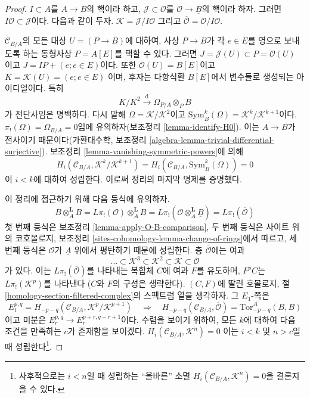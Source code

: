 \begin{proof}
$I \subset A$를 $A \to B$의 핵이라 하고, $\mathcal{J} \subset \mathcal{O}$를
$\mathcal{O} \to \underline{B}$의 핵이라 하자. 그러면
$I\mathcal{O} \subset \mathcal{J}$이다. 다음과 같이 두자.
$\mathcal{K} = \mathcal{J}/I\mathcal{O}$ 그리고
$\overline{\mathcal{O}} = \mathcal{O}/I\mathcal{O}$.

\medskip\noindent
$\mathcal{C}_{B/A}$의 모든 대상 $U = (P \to B)$에 대하여, 사상
$P \to B$가 각 $e \in E$를 영으로 보내도록 하는 동형사상
$P = A[E]$를 택할 수 있다. 그러면
$J = \mathcal{J}(U) \subset P = \mathcal{O}(U)$
이고 $J = IP + (e; e \in E)$이다. 또한
$\overline{\mathcal{O}}(U) = B[E]$이고 $K = \mathcal{K}(U) = (e; e \in E)$
이며, 후자는 다항식환 $B[E]$에서 변수들로 생성되는 아이디얼이다. 특히
$$
K/K^2 \xrightarrow{\text{d}} \Omega_{P/A} \otimes_P B
$$
가 전단사임은 명백하다. 다시 말해
$\Omega = \mathcal{K}/\mathcal{K}^2$이고
$\text{Sym}_B^k(\Omega) = \mathcal{K}^k/\mathcal{K}^{k + 1}$이다.
$\pi_!(\Omega) = \Omega_{B/A} = 0$임에 유의하자(보조정리
\ref{lemma-identify-H0}). 이는 $A \to B$가 전사이기 때문이다(가환대수학,
보조정리 \ref{algebra-lemma-trivial-differential-surjective}). 보조정리
\ref{lemma-vanishing-symmetric-powers}에 의해
$$
H_i(\mathcal{C}_{B/A}, \mathcal{K}^k/\mathcal{K}^{k + 1}) =
H_i(\mathcal{C}_{B/A}, \text{Sym}^k_{\underline{B}}(\Omega)) = 0
$$
이 $i < k$에 대하여 성립한다. 이로써 정리의 마지막 명제를 증명했다.

\medskip\noindent
이 정리에 접근하기 위해 다음 등식에 유의하자.
$$
B \otimes_A^\mathbf{L} B = L\pi_!(\mathcal{O}) \otimes_A^\mathbf{L} B =
L\pi_!(\mathcal{O} \otimes_{\underline{A}}^\mathbf{L} \underline{B}) =
L\pi_!(\overline{\mathcal{O}})
$$
첫 번째 등식은 보조정리 \ref{lemma-apply-O-B-comparison}, 두 번째 등식은
사이트 위의 코호몰로지, 보조정리
\ref{sites-cohomology-lemma-change-of-rings}에서 따르고, 세 번째 등식은
$\mathcal{O}$가 $\underline{A}$ 위에서 평탄하기 때문에 성립한다. 층
$\overline{\mathcal{O}}$에는 여과
$$
\ldots \subset
\mathcal{K}^3 \subset
\mathcal{K}^2 \subset
\mathcal{K} \subset
\overline{\mathcal{O}}
$$
가 있다. 이는 $L\pi_!(\overline{\mathcal{O}})$를 나타내는 복합체 $C$에
여과 $F$를 유도하며, $F^pC$는 $L\pi_!(\mathcal{K}^p)$를 나타낸다
($C$와 $F$의 구성은 생략한다). $(C, F)$에 딸린 호몰로지, 절
\ref{homology-section-filtered-complex}의 스펙트럼 열을 생각하자. 그
$E_1$-쪽은
$$
E_1^{p, q} = H_{- p - q}(\mathcal{C}_{B/A}, \mathcal{K}^p/\mathcal{K}^{p + 1})
\quad\Rightarrow\quad
H_{- p - q}(\mathcal{C}_{B/A}, \overline{\mathcal{O}}) = 
\text{Tor}_{- p - q}^A(B, B)
$$
이고 미분은 $E_r^{p, q} \to E_r^{p + r, q - r + 1}$이다. 수렴을 보이기
위하여, 모든 $k$에 대하여 다음 조건을 만족하는 $c$가 존재함을 보이겠다.
$H_i(\mathcal{C}_{B/A}, \mathcal{K}^n) = 0$
이는 $i < k$ 및 $n > c$일 때 성립한다\footnote{사후적으로는 $i < n$일
때 성립하는 ``올바른'' 소멸
$H_i(\mathcal{C}_{B/A}, \mathcal{K}^n) = 0$을 결론지을 수 있다.}.


\end{proof}

